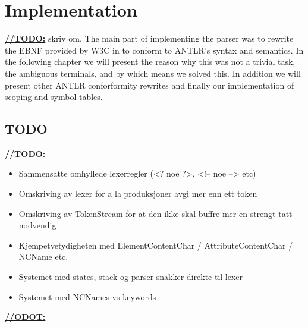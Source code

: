\chapter{Implementation}

\underline{\textbf{\LARGE //TODO:}} skriv om.
The main part of implementing the parser was to rewrite the EBNF provided by W3C in \cite{w3c01} to conform to ANTLR's syntax and semantics. In the following chapter we will present the reason why this was not a trivial task, the ambiguous terminals, and by which means we solved this. In addition we will present other ANTLR conforformity rewrites and finally our implementation of scoping and symbol tables.







\section{TODO}

\underline{\textbf{\LARGE //TODO:}}
\begin{itemize}
\item Sammensatte omhyllede lexerregler (<? noe ?>, <!-- noe --> etc)
\item Omskriving av lexer for a la produksjoner avgi mer enn ett token
\item Omskriving av TokenStream for at den ikke skal buffre mer en strengt tatt nodvendig
\item Kjempetvetydigheten med ElementContentChar / AttributeContentChar / NCName etc.
\item Systemet med states, stack og parser snakker direkte til lexer
\item Systemet med NCNames vs keywords
\end{itemize}

\underline{\textbf{\LARGE //ODOT:}}